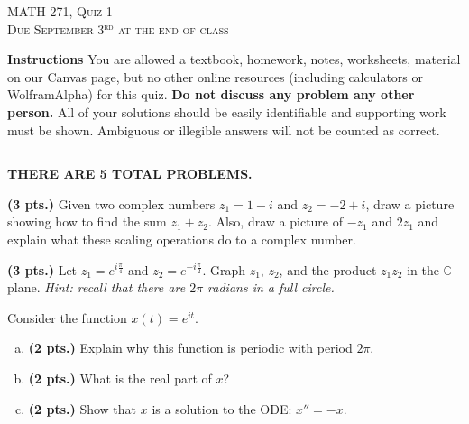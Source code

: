 \documentclass[12pt]{amsbook}
\begin{document}

\begin{center}
   \textsc{\large MATH 271, Quiz 1}\\
   \textsc{Due September 3$^\textrm{rd}$ at the end of class}
\end{center}

\vspace{1cm}

\noindent\textbf{Instructions} \; You are allowed a textbook, homework, notes, worksheets, material on our Canvas page, but no other online resources (including calculators or WolframAlpha) for this quiz.  \textbf{Do not discuss any problem any other person.} All of your solutions should be easily identifiable and supporting work must be shown.  Ambiguous or illegible answers will not be counted as correct.


\vspace*{.5cm}
\hrule
\vspace*{.5cm}

\begin{center}\textbf{\large THERE ARE 5 TOTAL PROBLEMS.}\normalsize \end{center}

\begin{problem}
\textbf{(3 pts.)} Given two complex numbers $z_1=1-i$ and $z_2 = -2+i$, draw a picture showing how to find the sum $z_1+z_2$. Also, draw a picture of $-z_1$ and $2z_1$ and explain what these scaling operations do to a complex number.
\end{problem}


\begin{problem}
\textbf{(3 pts.)} Let $z_1 = e^{i\frac{\pi}{4}}$ and $z_2=e^{-i \frac{\pi}{2}}$. Graph $z_1$, $z_2$, and the product $z_1 z_2$ in the $\mathbb{C}$-plane.  \emph{Hint: recall that there are $2\pi$ radians in a full circle.}
\end{problem}

\begin{problem}
Consider the function $x(t)=e^{it}$. 
\begin{enumerate}[(a)]
	\item \textbf{(2 pts.)} Explain why this function is periodic with period $2\pi$.
	\item \textbf{(2 pts.)} What is the real part of $x$?
	\item \textbf{(2 pts.)} Show that $x$ is a solution to the ODE: $x''=-x$. 
\end{enumerate}
\end{problem}
\end{document}
